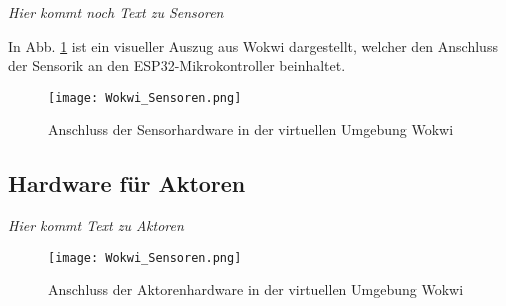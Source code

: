 \textit{Hier kommt noch Text zu Sensoren}

In Abb. \ref{fig:wokwi_sensoren} ist ein visueller Auszug aus Wokwi dargestellt, welcher den Anschluss der Sensorik an den ESP32-Mikrokontroller beinhaltet.

\begin{figure}[h]
    \centering
    \texttt{[image: Wokwi\_Sensoren.png]}
    \caption{Anschluss der Sensorhardware in der virtuellen Umgebung Wokwi}\label{fig:wokwi_sensoren}
\end{figure}

\subsection{Hardware für Aktoren}
\textit{Hier kommt Text zu Aktoren}

\begin{figure}[h]
    \centering
    \texttt{[image: Wokwi\_Sensoren.png]}
    \caption{Anschluss der Aktorenhardware in der virtuellen Umgebung Wokwi}\label{fig:wokwi_aktoren}
\end{figure}